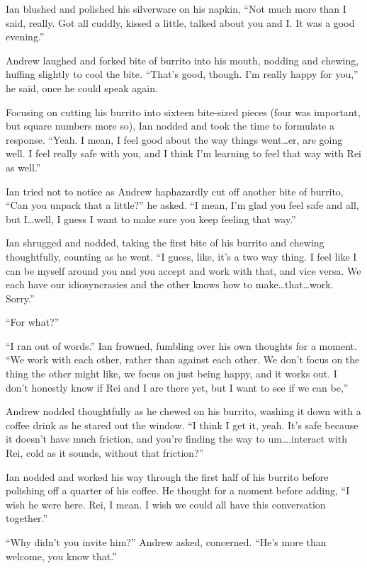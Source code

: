 Ian blushed and polished his silverware on his napkin, ``Not much more than I said, really. Got all cuddly, kissed a little, talked about you and I. It was a good evening.''

Andrew laughed and forked bite of burrito into his mouth, nodding and chewing, huffing slightly to cool the bite. ``That's good, though. I'm really happy for you,'' he said, once he could speak again.

Focusing on cutting his burrito into sixteen bite-sized pieces (four was important, but square numbers more so), Ian nodded and took the time to formulate a response. ``Yeah. I mean, I feel good about the way things went\ldots{}er, are going well. I feel really safe with you, and I think I'm learning to feel that way with Rei as well.''

Ian tried not to notice as Andrew haphazardly cut off another bite of burrito, ``Can you unpack that a little?'' he asked. ``I mean, I'm glad you feel safe and all, but I\ldots{}well, I guess I want to make sure you keep feeling that way.''

Ian shrugged and nodded, taking the first bite of his burrito and chewing thoughtfully, counting as he went. ``I guess, like, it's a two way thing. I feel like I can be myself around you and you accept and work with that, and vice versa. We each have our idiosyncrasies and the other knows how to make\ldots{}that\ldots{}work. Sorry.''

``For what?''

``I ran out of words.'' Ian frowned, fumbling over his own thoughts for a moment. ``We work with each other, rather than against each other. We don't focus on the thing the other might like, we focus on just being happy, and it works out. I don't honestly know if Rei and I are there yet, but I want to see if we can be,''

Andrew nodded thoughtfully as he chewed on his burrito, washing it down with a coffee drink as he stared out the window. ``I think I get it, yeah. It's safe because it doesn't have much friction, and you're finding the way to um\ldots{}.interact with Rei, cold as it sounds, without that friction?''

Ian nodded and worked his way through the first half of his burrito before polishing off a quarter of his coffee. He thought for a moment before adding, ``I wish he were here. Rei, I mean. I wish we could all have this conversation together.''

``Why didn't you invite him?'' Andrew asked, concerned. ``He's more than welcome, you know that.''

